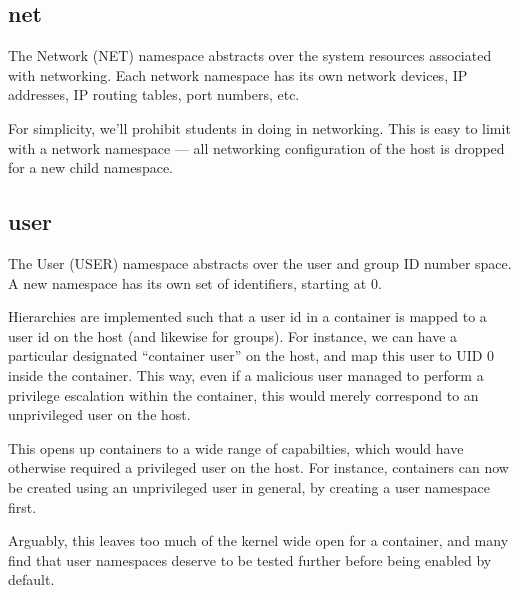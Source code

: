 \subsection{net}

The Network (NET) namespace abstracts over the system resources associated with
networking. Each network namespace has its own network devices, IP addresses,
IP routing tables, port numbers, etc.

For simplicity, we'll prohibit students in doing in networking. This is easy to
limit with a network namespace --- all networking configuration of the host is
dropped for a new child namespace.

\subsection{user}

\label{section:sandboxing:namespaces:user}

The User (USER) namespace abstracts over the user and group ID number space.
A new namespace has its own set of identifiers, starting at 0.

Hierarchies are implemented such that a user id in a container is mapped to a
user id on the host (and likewise for groups). For instance, we can have a
particular designated ``container user'' on the host, and map this user to UID
0 inside the container. This way, even if a malicious user managed to perform a
privilege escalation within the container, this would merely correspond to an
unprivileged user on the host.

This opens up containers to a wide range of capabilties, which would have
otherwise required a privileged user on the host. For instance, containers can
now be created using an unprivileged user in general, by creating a user
namespace first.

Arguably, this leaves too much of the kernel wide open for a container, and
many find that user namespaces deserve to be tested further before being
enabled by default\cite{kerrisk-2013, arch-linux-userns,fedora-userns}.
